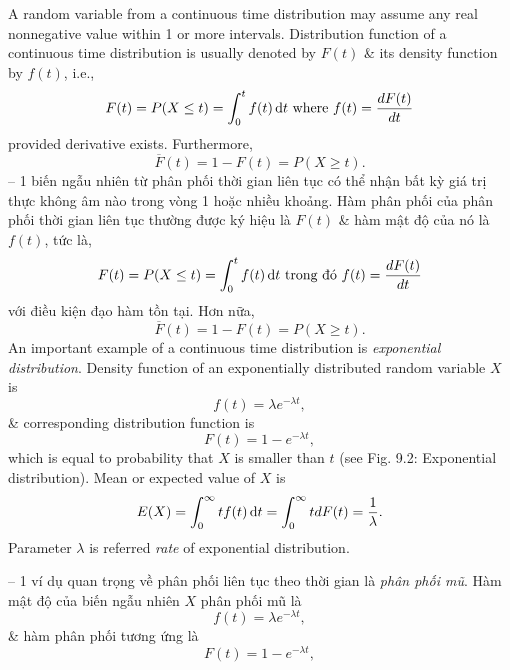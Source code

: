 \documentclass{article}
\begin{document}
\begin{itemize}
\begin{itemize}
        A random variable from a continuous time distribution may assume any real nonnegative value within 1 or more intervals. Distribution function of a continuous time distribution is usually denoted by $F(t)$ \& its density function by $f(t)$, i.e.,
        \begin{equation*}
            F(t) = P(X\le t) = \int_0^t f(t)\,{\rm d}t\mbox{ where } f(t) = \frac{dF(t)}{dt}
        \end{equation*}
        provided derivative exists. Furthermore,
        \begin{equation*}
            \overline{F}(t) = 1 - F(t) = P(X\ge t).
        \end{equation*}
        -- 1 biến ngẫu nhiên từ phân phối thời gian liên tục có thể nhận bất kỳ giá trị thực không âm nào trong vòng 1 hoặc nhiều khoảng. Hàm phân phối của phân phối thời gian liên tục thường được ký hiệu là $F(t)$ \& hàm mật độ của nó là $f(t)$, tức là,
        \begin{equation*}
            F(t) = P(X\le t) = \int_0^t f(t)\,{\rm d}t\mbox{ trong đó } f(t) = \frac{dF(t)}{dt}
        \end{equation*}
        với điều kiện đạo hàm tồn tại. Hơn nữa,
        \begin{equation*}
            \overline{F}(t) = 1 - F(t) = P(X\ge t).
        \end{equation*}
        An important example of a continuous time distribution is {\it exponential distribution}. Density function of an exponentially distributed random variable $X$ is
        \begin{equation*}
            f(t) = \lambda e^{-\lambda t},
        \end{equation*}
        \& corresponding distribution function is
        \begin{equation*}
            F(t) = 1 - e^{-\lambda t},
        \end{equation*}
        which is equal to probability that $X$ is smaller than $t$ (see {\sf Fig. 9.2: Exponential distribution}). Mean or expected value of $X$ is
        \begin{equation*}
            E(X) = \int_0^\infty tf(t)\,{\rm d}t = \int_0^\infty tdF(t) = \frac{1}{\lambda}.
        \end{equation*}
        Parameter $\lambda$ is referred {\it rate} of exponential distribution.

        -- 1 ví dụ quan trọng về phân phối liên tục theo thời gian là {\it phân phối mũ}. Hàm mật độ của biến ngẫu nhiên $X$ phân phối mũ là
        \begin{equation*}
            f(t) = \lambda e^{-\lambda t},
        \end{equation*}
        \& hàm phân phối tương ứng là
        \begin{equation*}
            F(t) = 1 - e^{-\lambda t},
        \end{equation*}


\end{itemize}
\end{itemize}
\end{document}
